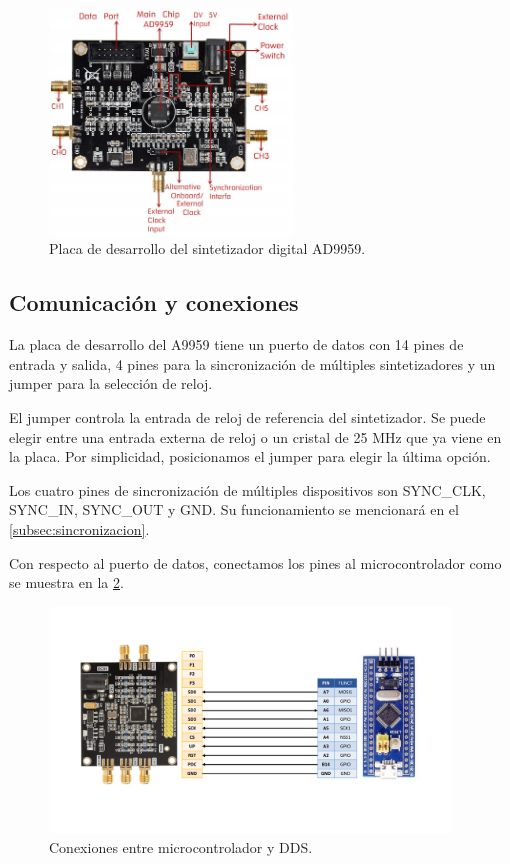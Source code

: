 \documentclass{article}
\newenvironment{standalone}{\begin{preview}}{\end{preview}}
\begin{document}
\begin{standalone}
  \begin{figure}[!htbp]
    \centering
    \includegraphics[width=\linewidth, height=60mm, keepaspectratio]{../images/ad9959.jpg}
    \caption{Placa de desarrollo del sintetizador digital AD9959.}
    \label{fig:ad9959}
  \end{figure}

  \subsection{Comunicación y conexiones}

  La placa de desarrollo del A9959 tiene un puerto de datos con 14 pines de entrada y salida, 4 pines para la sincronización de múltiples sintetizadores y un jumper para la selección de reloj.

  El jumper controla la entrada de reloj de referencia del sintetizador.
  Se puede elegir entre una entrada externa de reloj o un cristal de 25 MHz que ya viene en la placa.
  Por simplicidad, posicionamos el jumper para elegir la última opción.

  Los cuatro pines de sincronización de múltiples dispositivos son SYNC\_CLK, SYNC\_IN, SYNC\_OUT y GND.
  Su funcionamiento se mencionará en el \cref{subsec:sincronizacion}.

  Con respecto al puerto de datos, conectamos los pines al microcontrolador como se muestra en la \cref{fig:conexiones}.

  \begin{figure}[!htbp]
    \centering
    \includegraphics[trim=40pt 100pt 40pt 100pt, clip, width=\linewidth, height=60mm, keepaspectratio]{../images/conexiones.pdf}
    \caption{Conexiones entre microcontrolador y DDS.}
    \label{fig:conexiones}
  \end{figure}


\end{standalone}
\end{document}
